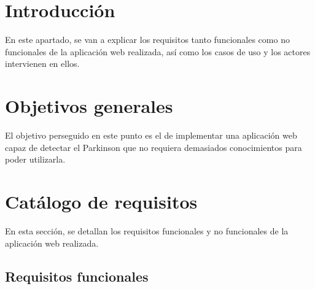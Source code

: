 
\section{Introducción}
En este apartado, se van a explicar los requisitos tanto funcionales como no funcionales de la aplicación web realizada, así como los casos de uso y los actores intervienen en ellos.
\section{Objetivos generales}
El objetivo perseguido en este punto es el de implementar una aplicación web capaz de detectar el Parkinson que no requiera demasiados conocimientos para poder utilizarla.
\section{Catálogo de requisitos}
En esta sección, se detallan los requisitos funcionales y no funcionales de la aplicación web realizada.

\subsection{Requisitos funcionales}

